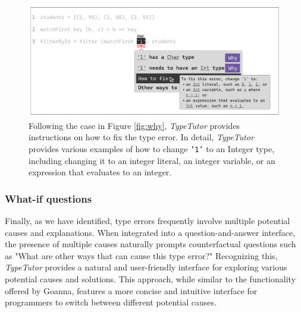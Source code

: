 \begin{figure}[hbt]
  \includegraphics[width=\linewidth]{How}
  \caption{
    Following the case in Figure \ref{fig:why}, \textit{TypeTutor} provides instructions on how to fix the type error. In detail,  \textit{TypeTutor} provides various examples of how to change \texttt{'1'} to an Integer type, including changing it to an integer literal, an integer variable, or an expression that evaluates to an integer.
    }
\end{figure}

\subsubsection{What-if questions}
Finally, as we have identified, type errors frequently involve multiple potential causes and explanations. When integrated into a question-and-answer interface, the presence of multiple causes naturally prompts counterfactual questions such as "What are other ways that can cause this type error?" Recognizing this, \textit{TypeTutor} provides a natural and user-friendly interface for exploring various potential causes and solutions. This approach, while similar to the functionality offered by Goanna, features a more concise and intuitive interface for programmers to switch between different potential causes.

